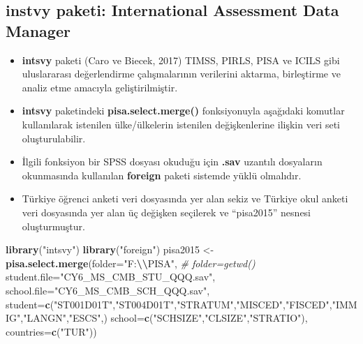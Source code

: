 \documentclass[
  oneside]{book}
\newenvironment{Shaded}{\begin{snugshade}}{\end{snugshade}}
\newcommand{\AttributeTok}[1]{\textcolor[rgb]{0.13,0.29,0.53}{#1}}
\newcommand{\CommentTok}[1]{\textcolor[rgb]{0.56,0.35,0.01}{\textit{#1}}}
\newcommand{\FunctionTok}[1]{\textcolor[rgb]{0.13,0.29,0.53}{\textbf{#1}}}
\newcommand{\NormalTok}[1]{#1}
\newcommand{\OtherTok}[1]{\textcolor[rgb]{0.56,0.35,0.01}{#1}}
\newcommand{\SpecialCharTok}[1]{\textcolor[rgb]{0.81,0.36,0.00}{\textbf{#1}}}
\newcommand{\StringTok}[1]{\textcolor[rgb]{0.31,0.60,0.02}{#1}}
\begin{document}
\hypertarget{instvy-paketi-international-assessment-data-manager}{%
\subsection{\texorpdfstring{\textbf{instvy} paketi: International Assessment Data Manager}{instvy paketi: International Assessment Data Manager}}\label{instvy-paketi-international-assessment-data-manager}}

\begin{itemize}
\item
  \textbf{intsvy} paketi (Caro ve Biecek, 2017) TIMSS, PIRLS, PISA ve ICILS gibi uluslararası değerlendirme çalışmalarının verilerini aktarma, birleştirme ve analiz etme amacıyla geliştirilmiştir.
\item
  \textbf{intsvy} paketindeki \textbf{pisa.select.merge()} fonksiyonuyla aşağıdaki komutlar kullanılarak istenilen ülke/ülkelerin istenilen değişkenlerine ilişkin veri seti oluşturulabilir.
\item
  İlgili fonksiyon bir SPSS dosyası okuduğu için \textbf{.sav} uzantılı dosyaların okunmasında kullanılan \textbf{foreign} paketi sistemde yüklü olmalıdır.
\item
  Türkiye öğrenci anketi veri dosyasında yer alan sekiz ve Türkiye okul anketi veri dosyasında yer alan üç değişken seçilerek ve ``pisa2015'' nesnesi oluşturmuştur.
\end{itemize}

\begin{Shaded}
\begin{Highlighting}[]
\FunctionTok{library}\NormalTok{(}\StringTok{"intsvy"}\NormalTok{)}
\FunctionTok{library}\NormalTok{(}\StringTok{"foreign"}\NormalTok{)}
\NormalTok{pisa2015 }\OtherTok{\textless{}{-}} \FunctionTok{pisa.select.merge}\NormalTok{(}\AttributeTok{folder=}\StringTok{"F:}\SpecialCharTok{\textbackslash{}\textbackslash{}}\StringTok{PISA"}\NormalTok{, }\CommentTok{\# folder=getwd()}
\AttributeTok{student.file=}\StringTok{"CY6\_MS\_CMB\_STU\_QQQ.sav"}\NormalTok{,}
\AttributeTok{school.file=}\StringTok{"CY6\_MS\_CMB\_SCH\_QQQ.sav"}\NormalTok{,}
\AttributeTok{student=}\FunctionTok{c}\NormalTok{(}\StringTok{"ST001D01T"}\NormalTok{,}\StringTok{"ST004D01T"}\NormalTok{,}\StringTok{"STRATUM"}\NormalTok{,}\StringTok{"MISCED"}\NormalTok{,}\StringTok{"FISCED"}\NormalTok{,}\StringTok{"IMMIG"}\NormalTok{,}\StringTok{"LANGN"}\NormalTok{,}\StringTok{"ESCS"}\NormalTok{,)}
\AttributeTok{school=}\FunctionTok{c}\NormalTok{(}\StringTok{"SCHSIZE"}\NormalTok{,}\StringTok{"CLSIZE"}\NormalTok{,}\StringTok{"STRATIO"}\NormalTok{),}
  \AttributeTok{countries=}\FunctionTok{c}\NormalTok{(}\StringTok{"TUR"}\NormalTok{))}
\end{Highlighting}
\end{Shaded}
\end{document}
